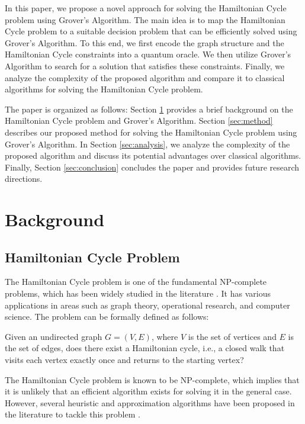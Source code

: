 In this paper, we propose a novel approach for solving the Hamiltonian Cycle problem using Grover's Algorithm. The main idea is to map the Hamiltonian Cycle problem to a suitable decision problem that can be efficiently solved using Grover's Algorithm. To this end, we first encode the graph structure and the Hamiltonian Cycle constraints into a quantum oracle. We then utilize Grover's Algorithm to search for a solution that satisfies these constraints. Finally, we analyze the complexity of the proposed algorithm and compare it to classical algorithms for solving the Hamiltonian Cycle problem.

The paper is organized as follows: Section \ref{sec:background} provides a brief background on the Hamiltonian Cycle problem and Grover's Algorithm. Section \ref{sec:method} describes our proposed method for solving the Hamiltonian Cycle problem using Grover's Algorithm. In Section \ref{sec:analysis}, we analyze the complexity of the proposed algorithm and discuss its potential advantages over classical algorithms. Finally, Section \ref{sec:conclusion} concludes the paper and provides future research directions.

\section{Background}\label{sec:background}

\subsection{Hamiltonian Cycle Problem}\label{subsec:hcp}

The Hamiltonian Cycle problem is one of the fundamental NP-complete problems, which has been widely studied in the literature \cite{garey1979computers}. It has various applications in areas such as graph theory, operational research, and computer science. The problem can be formally defined as follows:

\begin{definition}
Given an undirected graph $G = (V, E)$, where $V$ is the set of vertices and $E$ is the set of edges, does there exist a Hamiltonian cycle, i.e., a closed walk that visits each vertex exactly once and returns to the starting vertex?
\end{definition}

The Hamiltonian Cycle problem is known to be NP-complete, which implies that it is unlikely that an efficient algorithm exists for solving it in the general case. However, several heuristic and approximation algorithms have been proposed in the literature to tackle this problem \cite{skiena1990implementation, johnson1990local}.

